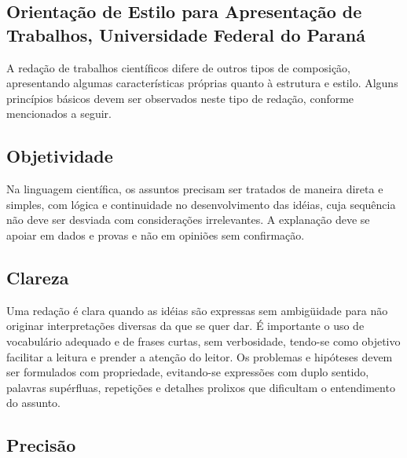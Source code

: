 \documentclass[repeatfields,xlists,xpacks,oneside,yearsonly]{ufrgscca}
\begin{document}
    \begin{annex}


        \chapter{Orientação de Estilo para Apresentação de Trabalhos, Universidade Federal do Paraná}

        A redação de trabalhos científicos difere de outros tipos de composição,
        apresentando algumas características próprias quanto à estrutura e estilo.
        Alguns princípios básicos devem ser observados neste tipo de redação,
        conforme mencionados a seguir.

        \section{Objetividade}

        Na linguagem científica, os assuntos precisam ser tratados de maneira direta
        e simples, com lógica e continuidade no desenvolvimento das idéias, cuja
        sequência não deve ser desviada com considerações irrelevantes. A explanação
        deve se apoiar em dados e provas e não em opiniões sem confirmação.

        \section{Clareza}

        Uma redação é clara quando as idéias são expressas sem ambigüidade para não
        originar interpretações diversas da que se quer dar. É importante o uso de
        vocabulário adequado e de frases curtas, sem verbosidade, tendo-se como
        objetivo facilitar a leitura e prender a atenção do leitor. Os problemas e
        hipóteses devem ser formulados com propriedade, evitando-se expressões com
        duplo sentido, palavras supérfluas, repetições e detalhes prolixos que
        dificultam o entendimento do assunto.

        \section{Precisão}


\end{annex}
\end{document}
